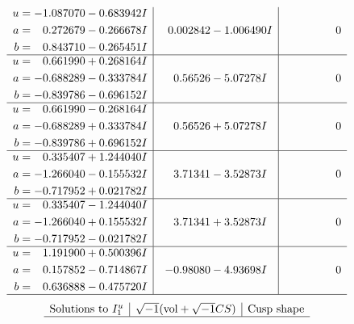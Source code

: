 \documentclass[1p]{elsarticle_modified}
\theoremstyle{definition}
\newcommand{\I}{\sqrt{-1}}
\begin{document}
$$\begin{array}{c|c|c}
\begin{aligned}
u &= -1.087070 - 0.683942 I \\
a &= \phantom{-}0.272679 - 0.266678 I \\
b &= \phantom{-}0.843710 - 0.265451 I\end{aligned}
 & \phantom{-}0.002842 - 1.006490 I & \phantom{-0.000000 } 0 \\ \hline\begin{aligned}
u &= \phantom{-}0.661990 + 0.268164 I \\
a &= -0.688289 - 0.333784 I \\
b &= -0.839786 - 0.696152 I\end{aligned}
 & \phantom{-}0.56526 - 5.07278 I & \phantom{-0.000000 } 0 \\ \hline\begin{aligned}
u &= \phantom{-}0.661990 - 0.268164 I \\
a &= -0.688289 + 0.333784 I \\
b &= -0.839786 + 0.696152 I\end{aligned}
 & \phantom{-}0.56526 + 5.07278 I & \phantom{-0.000000 } 0 \\ \hline\begin{aligned}
u &= \phantom{-}0.335407 + 1.244040 I \\
a &= -1.266040 - 0.155532 I \\
b &= -0.717952 + 0.021782 I\end{aligned}
 & \phantom{-}3.71341 - 3.52873 I & \phantom{-0.000000 } 0 \\ \hline\begin{aligned}
u &= \phantom{-}0.335407 - 1.244040 I \\
a &= -1.266040 + 0.155532 I \\
b &= -0.717952 - 0.021782 I\end{aligned}
 & \phantom{-}3.71341 + 3.52873 I & \phantom{-0.000000 } 0 \\ \hline\begin{aligned}
u &= \phantom{-}1.191900 + 0.500396 I \\
a &= \phantom{-}0.157852 - 0.714867 I \\
b &= \phantom{-}0.636888 - 0.475720 I\end{aligned}
 & -0.98080 - 4.93698 I & \phantom{-0.000000 } 0\\
 \hline 
 \end{array}$$\newpage$$\begin{array}{c|c|c}  
\text{Solutions to }I^u_{1}& \I (\text{vol} + \sqrt{-1}CS) & \text{Cusp shape}\\
 \hline 

\end{array}$$
\end{document}
